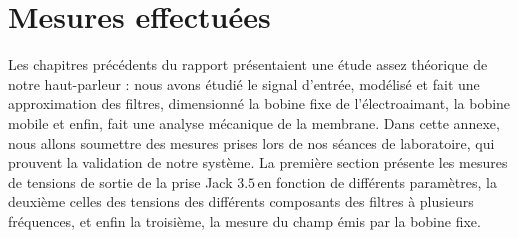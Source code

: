 \chapter{Mesures effectuées}

Les chapitres précédents du rapport présentaient une étude assez théorique de notre haut-parleur : nous avons étudié le signal d'entrée, modélisé et fait une approximation des filtres, dimensionné la bobine fixe de l'électroaimant, la bobine mobile et enfin, fait une analyse mécanique de la membrane.
Dans cette annexe, nous allons soumettre des mesures prises lors de nos séances de laboratoire, qui prouvent la validation de notre système.
La première section présente les mesures de tensions de sortie de la prise Jack $3.5$\milli\meter \,en fonction de différents paramètres, la deuxième celles des tensions des différents composants des filtres à plusieurs fréquences, et enfin la troisième, la mesure du champ émis par la bobine fixe.




